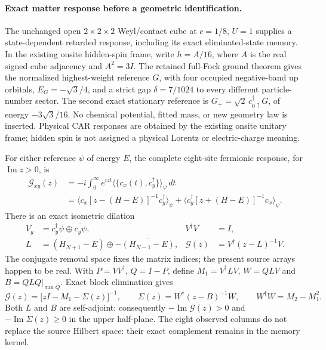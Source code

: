 \paragraph{Exact matter response before a geometric identification.}
The unchanged open $2\times2\times2$ Weyl/contact cube at
$c=1/8$, $U=1$ supplies a state-dependent retarded response, including
its exact eliminated-state memory.  In the existing onsite hidden-spin
frame, write $h=A/16$, where $A$ is the real signed cube adjacency and
$A^2=3I$.  The retained full-Fock ground theorem gives the normalized
highest-weight reference $G$, with four occupied negative-band up orbitals,
$E_G=-\sqrt3/4$, and a strict gap $\delta=7/1024$ to every different
particle-number sector.  The second exact stationary reference is
$G_+=\sqrt2\,c_{0\uparrow}^{\dagger}G$, of energy $-3\sqrt3/16$.
No chemical potential, fitted mass, or new geometry law is inserted.
Physical CAR responses are obtained by the existing onsite unitary frame;
hidden spin is not assigned a physical Lorentz or electric-charge meaning.

For either reference $\psi$ of energy $E$, the complete eight-site
fermionic response, for $\operatorname{Im}z>0$, is
\begin{align*}
\mathcal G_{xy}(z)
 &=-i\int_0^\infty e^{izt}
       \langle\{c_x(t),c_y^\dagger\}\rangle_\psi\,dt\\
 &=\langle c_x[z-(H-E)]^{-1}c_y^\dagger\rangle_\psi
   +\langle c_y^\dagger[z+(H-E)]^{-1}c_x\rangle_\psi.
\end{align*}
There is an exact isometric dilation
\begin{align*}
V_y&=c_y^\dagger\psi\oplus\overline{c_y\psi},
 &V^\dagger V&=I,\\
L&=(H_{N+1}-E)\oplus-\overline{(H_{N-1}-E)},
 &\mathcal G(z)&=V^\dagger(z-L)^{-1}V.
\end{align*}
The conjugate removal space fixes the matrix indices; the present source
arrays happen to be real.  With $P=VV^\dagger$, $Q=I-P$, define
$M_1=V^\dagger LV$, $W=QLV$ and
$B=QLQ|_{\operatorname{ran}Q}$.  Exact block elimination gives
\[
\mathcal G(z)=\bigl[zI-M_1-\Sigma(z)\bigr]^{-1},
\qquad
\Sigma(z)=W^\dagger(z-B)^{-1}W,
\qquad W^\dagger W=M_2-M_1^2.
\]
Both $L$ and $B$ are self-adjoint; consequently
$-\operatorname{Im}\mathcal G(z)>0$ and
$-\operatorname{Im}\Sigma(z)\geq0$ in the upper half-plane.
The eight observed columns do not replace the source Hilbert space:
their exact complement remains in the memory kernel.

